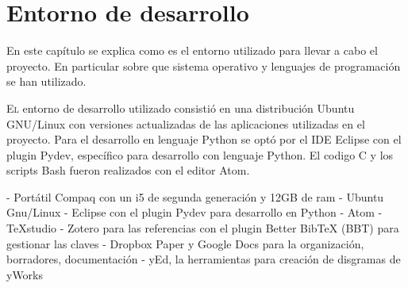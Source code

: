 
\chapter{Entorno de desarrollo}
\label{chap:entorno-desarrollo}

En este capítulo se explica como es el entorno utilizado para llevar a cabo el proyecto. En particular sobre que sistema operativo y lenguajes de programación se han utilizado.

\lettrine{E}{l} entorno de desarrollo utilizado consistió en una distribución Ubuntu GNU/Linux con versiones actualizadas de las aplicaciones utilizadas en el proyecto. Para el desarrollo en lenguaje Python se optó por el IDE Eclipse con el plugin Pydev, específico para desarrollo con lenguaje Python. El codigo C y los scripts Bash fueron realizados con el editor Atom.

- Portátil Compaq con un i5 de segunda generación y 12GB de ram
- Ubuntu Gnu/Linux
- Eclipse con el plugin Pydev para desarrollo en Python
- Atom
- TeXstudio
- Zotero para las referencias con el plugin Better BibTeX (BBT) para gestionar las claves
- Dropbox Paper y Google Docs para la organización, borradores, documentación
- yEd, la herramientas para creación de disgramas de yWorks